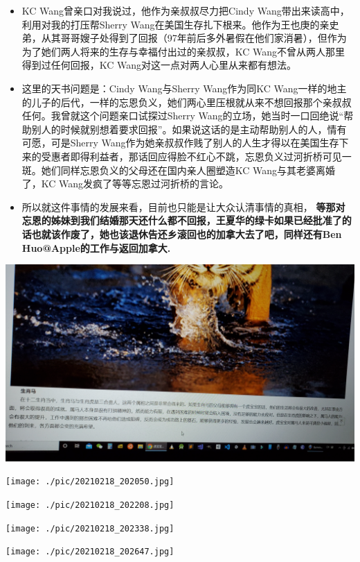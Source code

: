 \documentclass[9pt, b5paper]{article}
\begin{document}
\begin{itemize}
\begin{itemize}
\begin{itemize}
\item KC Wang曾亲口对我说过，他作为亲叔叔尽力把Cindy Wang带出来读高中，利用对我的打压帮Sherry Wang在美国生存扎下根来。他作为王也庚的亲史弟，从其哥哥嫂子处得到了回报（97年前后多外暑假在他们家消暑），但作为为了她们两人将来的生存与幸福付出过的亲叔叔，KC Wang不曾从两人那里得到过任何回报，KC Wang对这一点对两人心里从来都有想法。
\item 这里的天书问题是：Cindy Wang与Sherry Wang作为同KC Wang一样的地主的儿子的后代，一样的忘恩负义，她们两心里压根就从来不想回报那个亲叔叔任何。我曾就这个问题亲口试探过Sherry Wang的立场，她当时一口回绝说“帮助别人的时候就别想着要求回报”。如果说这话的是主动帮助别人的人，情有可愿，可是Sherry Wang作为她亲叔叔作贱了别人的人生才得以在美国生存下来的受惠者即得利益者，那话回应得脸不红心不跳，忘恩负义过河折桥可见一斑。她们同样忘恩负义的父母还在国内亲人圈塑造KC Wang与其老婆离婚了，KC Wang发疯了等等忘恩过河折桥的言论。
\item 所以就这件事情的发展来看，目前也只能是让大众认清事情的真相， \textbf{等那对忘恩的姊妹到我们结婚那天还什么都不回报，王夏华的绿卡如果已经批准了的话也就该作废了，她也该退休告还乡滚回也的加拿大去了吧，同样还有Ben Huo@Apple的工作与返回加拿大.}
\end{itemize}
\includegraphics[width=.9\linewidth]{./pic/20210218_200445.jpg}

\texttt{[image: ./pic/20210218\_202050.jpg]}

\texttt{[image: ./pic/20210218\_202208.jpg]}

\texttt{[image: ./pic/20210218\_202338.jpg]}

\texttt{[image: ./pic/20210218\_202647.jpg]}


\end{itemize}
\end{itemize}
\end{document}
